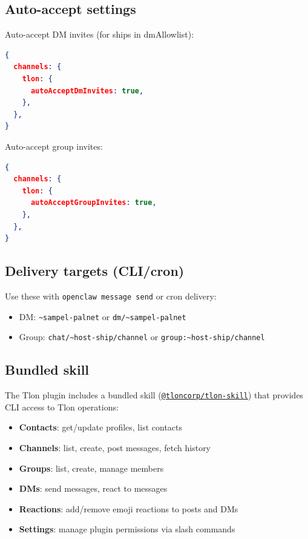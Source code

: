 \subsection{Auto-accept settings}


Auto-accept DM invites (for ships in dmAllowlist):

\begin{lstlisting}[language=json]
{
  channels: {
    tlon: {
      autoAcceptDmInvites: true,
    },
  },
}
\end{lstlisting}


Auto-accept group invites:

\begin{lstlisting}[language=json]
{
  channels: {
    tlon: {
      autoAcceptGroupInvites: true,
    },
  },
}
\end{lstlisting}


\subsection{Delivery targets (CLI/cron)}


Use these with \texttt{openclaw message send} or cron delivery:

\begin{itemize}
  \item DM: \texttt{\textasciitilde{}sampel-palnet} or \texttt{dm/\textasciitilde{}sampel-palnet}
  \item Group: \texttt{chat/\textasciitilde{}host-ship/channel} or \texttt{group:\textasciitilde{}host-ship/channel}
\end{itemize}


\subsection{Bundled skill}


The Tlon plugin includes a bundled skill (\href{https://github.com/tloncorp/tlon-skill}{\texttt{@tloncorp/tlon-skill}})
that provides CLI access to Tlon operations:

\begin{itemize}
  \item \textbf{Contacts}: get/update profiles, list contacts
  \item \textbf{Channels}: list, create, post messages, fetch history
  \item \textbf{Groups}: list, create, manage members
  \item \textbf{DMs}: send messages, react to messages
  \item \textbf{Reactions}: add/remove emoji reactions to posts and DMs
  \item \textbf{Settings}: manage plugin permissions via slash commands
\end{itemize}


